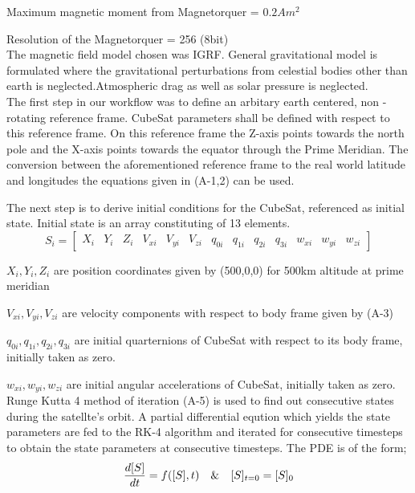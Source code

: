 \documentclass[11pt]{report}
\begin{document}
	\noindent Maximum magnetic moment from Magnetorquer = $0.2Am^2$
	
	\noindent Resolution of the Magnetorquer = 256 (8bit)\\
	
	The magnetic field model chosen was IGRF. General gravitational model is formulated where the gravitational perturbations from celestial bodies other than earth is neglected.Atmospheric drag as well as solar pressure is neglected.\\
	
	The first step in our workflow was to define an arbitary earth centered, non - rotating reference frame. CubeSat parameters shall be defined with respect to this reference frame. On this reference frame the Z-axis points towards the north pole and the X-axis points towards the equator through the Prime Meridian. The conversion between the aforementioned reference frame to the real world latitude and longitudes the equations given in (A-1,2) can be used.
	
	The next step is to derive initial conditions for the CubeSat, referenced as initial state. Initial state is an array constituting of 13 elements. $$S_i = [\begin{array}{lllllllllllll}
		X_i & Y_i & Z_i & V_{xi} & V_{yi} & V_{zi} & q_{0i} & q_{1i} & q_{2i} & q_{3i} & w_{xi} & w_{yi} & w_{zi}
	\end{array}]$$
	
	$X_i,Y_i,Z_i$ are position coordinates given by (500,0,0) for 500km altitude at prime meridian
	
	$V_{xi},V_{yi},V_{zi}$ are velocity components with respect to body frame given by (A-3)
	
	$q_{0i},q_{1i},q_{2i},q_{3i}$ are initial quarternions of CubeSat with respect to its body frame, initially taken as zero.
	
	$w_{xi},w_{yi},w_{zi}$ are initial angular accelerations of CubeSat, initially taken as zero.\\
	
	Runge Kutta 4 method of iteration (A-5) is used to find out consecutive states during the satellte's orbit. A partial differential eqution which yields the state parameters are fed to the RK-4 algorithm and iterated for consecutive timesteps to obtain the state parameters at consecutive timesteps. The PDE is of the form;$$\frac{d[S]}{dt} = f([S],t) \text{\hspace{10pt}\&\hspace{10pt}} [S]_{t=0} = [S]_0$$
	
\end{document}
